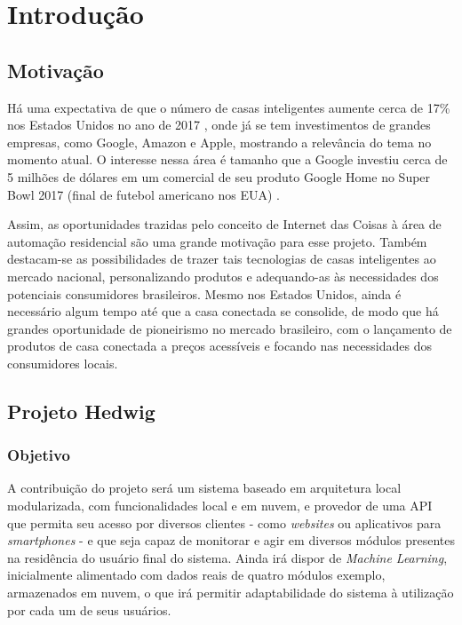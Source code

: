 \chapter{Introdução}

\section{Motivação}
Há uma expectativa de que o número de casas inteligentes aumente cerca de 17\% nos Estados Unidos no ano de 2017 \cite{mckinseyReport}, onde já se tem investimentos de grandes empresas, como Google, Amazon e Apple, mostrando a relevância do tema no momento atual. O interesse nessa área é tamanho que a Google investiu cerca de 5 milhões de dólares em um comercial de seu produto Google Home no Super Bowl 2017 (final de futebol americano nos EUA) \cite{kennemer}.

Assim, as oportunidades trazidas pelo conceito de Internet das Coisas à área de automação residencial são uma grande motivação para esse projeto. Também destacam-se as possibilidades de trazer tais tecnologias de casas inteligentes ao mercado nacional, personalizando produtos e adequando-as às necessidades dos potenciais consumidores brasileiros. Mesmo nos Estados Unidos, ainda é necessário algum tempo até que a casa conectada se consolide, de modo que há grandes oportunidade de pioneirismo no mercado brasileiro, com o lançamento de produtos de casa conectada a preços acessíveis e focando nas necessidades dos consumidores locais.

\section{Projeto Hedwig}

\subsection{Objetivo}
A contribuição do projeto será um sistema baseado em arquitetura local modularizada, com funcionalidades local e em nuvem, e provedor de uma API que permita seu acesso por diversos clientes - como \textit{websites} ou aplicativos para \textit{smartphones} - e que seja capaz de monitorar e agir em diversos módulos presentes na residência do usuário final do sistema. Ainda irá dispor de \textit{Machine Learning}, inicialmente alimentado com dados reais de quatro módulos exemplo, armazenados em nuvem, o que irá permitir adaptabilidade do sistema à utilização por cada um de seus usuários.

